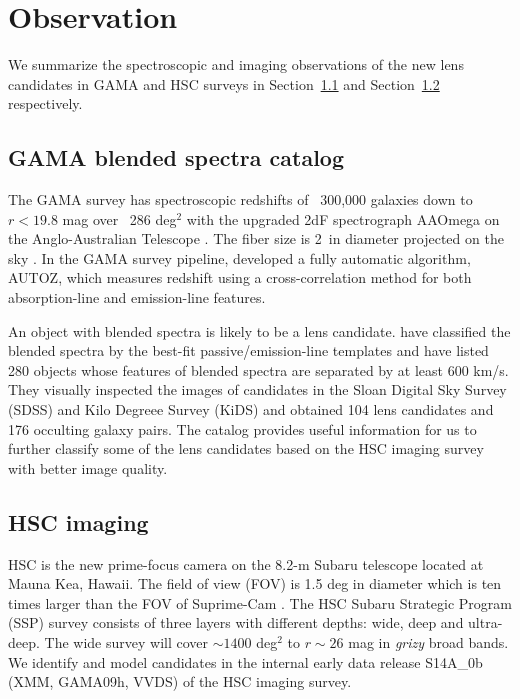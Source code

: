 \documentclass[apj]{emulateapj}
\newcommand{\sref}[1]{Section~\ref{#1}}
\begin{document}
\section{Observation}
\label{sec:observation}


We summarize the spectroscopic and imaging observations 
of the new lens candidates in GAMA and HSC surveys in \sref{subsec:catalog} and \sref{subsec:imaging} respectively.

\subsection{GAMA blended spectra catalog}
\label{subsec:catalog}
The GAMA survey has spectroscopic redshifts of ~300,000 galaxies down to $r<19.8$ mag over ~286 deg$^2$ 
with the upgraded 2dF spectrograph AAOmega on the Anglo-Australian Telescope 
\citep{DriverEtal09,DriverEtal11,BaldryEtal10}. 
The fiber size is 2\arcsec\ in diameter projected on the sky 
\citep{HopkinsEtal13}.
In the GAMA survey pipeline, \citet{BaldryEtal14} developed a fully automatic algorithm, AUTOZ, 
which measures redshift using a cross-correlation method for both absorption-line and emission-line features. 

An object with blended spectra is likely to be a lens candidate. 
\citet{HolwerdaEtal15} have classified the blended spectra by the best-fit passive/emission-line templates
and have listed 280 objects whose features 
of blended spectra are separated by at least 600 km/s.
They visually inspected the images of candidates in the Sloan Digital Sky Survey (SDSS) and Kilo Degreee Survey (KiDS) and obtained 
104 lens candidates and 176 occulting galaxy pairs. 
The catalog provides useful information for us to further classify some of the lens candidates based on the HSC imaging survey with better image quality. 



\subsection{HSC imaging}
\label{subsec:imaging}

HSC is the new prime-focus camera
on the 8.2-m Subaru telescope located at Mauna Kea, Hawaii. 
The field of view (FOV) is 1.5 deg in diameter \citep{MiyazakiEtal12} which is ten times larger than the FOV of Suprime-Cam \citep{MiyazakiEtal02}. 
The HSC Subaru Strategic Program (SSP) survey consists of three layers with different depths: wide, deep and ultra-deep. 
The wide survey will cover $\sim1400$ deg$^2$ to $r\sim26$ mag in {\it grizy} broad bands.
We identify and model candidates in the internal early data release S14A\_0b (XMM, GAMA09h, VVDS) 
of the HSC imaging survey.
\end{document}
